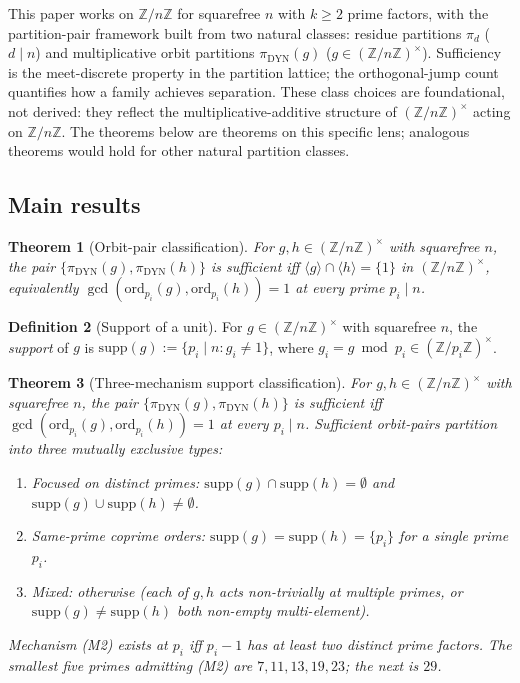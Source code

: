 \documentclass[11pt,reqno]{amsart}
\theoremstyle{plain}
\newtheorem{theorem}{Theorem}
\theoremstyle{definition}
\newtheorem{definition}[theorem]{Definition}
\newcommand{\Z}{\mathbb{Z}}
\newcommand{\Zn}{\Z/n\Z}
\newcommand{\Zns}{(\Z/n\Z)^{\times}}
\newcommand{\DYN}{\mathrm{DYN}}
\newcommand{\supp}{\mathrm{supp}}
\newcommand{\ord}{\mathrm{ord}}
\begin{document}
This paper works on $\Zn$ for squarefree $n$ with $k \geq 2$ prime factors, with the partition-pair framework built from two natural classes: residue partitions $\pi_d$ ($d \mid n$) and multiplicative orbit partitions $\pi_{\DYN}(g)$ ($g \in \Zns$). Sufficiency is the meet-discrete property in the partition lattice; the orthogonal-jump count quantifies how a family achieves separation. These class choices are foundational, not derived: they reflect the multiplicative-additive structure of $\Zns$ acting on $\Zn$. The theorems below are theorems on this specific lens; analogous theorems would hold for other natural partition classes.

\subsection{Main results}

\begin{theorem}[Orbit-pair classification] \label{thm:orbit-pair}
For $g, h \in \Zns$ with squarefree $n$, the pair $\{\pi_{\DYN}(g), \pi_{\DYN}(h)\}$ is sufficient iff $\langle g \rangle \cap \langle h \rangle = \{1\}$ in $\Zns$, equivalently $\gcd(\ord_{p_i}(g), \ord_{p_i}(h)) = 1$ at every prime $p_i \mid n$.
\end{theorem}

\begin{definition}[Support of a unit] \label{def:support}
For $g \in \Zns$ with squarefree $n$, the \emph{support} of $g$ is $\supp(g) := \{p_i \mid n : g_i \neq 1\}$, where $g_i = g \bmod p_i \in (\Z/p_i\Z)^{\times}$.
\end{definition}

\begin{theorem}[Three-mechanism support classification] \label{thm:mechanisms}
For $g, h \in \Zns$ with squarefree $n$, the pair $\{\pi_{\DYN}(g), \pi_{\DYN}(h)\}$ is sufficient iff $\gcd(\ord_{p_i}(g), \ord_{p_i}(h)) = 1$ at every $p_i \mid n$. Sufficient orbit-pairs partition into three mutually exclusive types:
\begin{enumerate}[label=\textup{(M\arabic*)}]
\item \emph{Focused on distinct primes:} $\supp(g) \cap \supp(h) = \emptyset$ and $\supp(g) \cup \supp(h) \neq \emptyset$.
\item \emph{Same-prime coprime orders:} $\supp(g) = \supp(h) = \{p_i\}$ for a single prime $p_i$.
\item \emph{Mixed:} otherwise (each of $g, h$ acts non-trivially at multiple primes, or $\supp(g) \neq \supp(h)$ both non-empty multi-element).
\end{enumerate}
Mechanism \textup{(M2)} exists at $p_i$ iff $p_i - 1$ has at least two distinct prime factors. The smallest five primes admitting \textup{(M2)} are $7, 11, 13, 19, 23$; the next is $29$.
\end{theorem}
\end{document}
